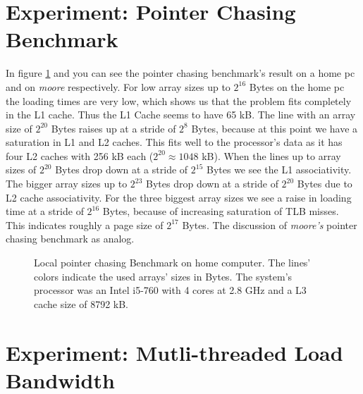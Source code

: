 \documentclass[DIV=12,oneside,a4paper]{scrartcl}
\begin{document}
\section{Experiment: Pointer Chasing Benchmark}
In figure \ref{pointer_chasing_local} and %
you can see the pointer chasing benchmark's result on a home pc and on \emph{moore}
respectively. For low array sizes up to $2^{16}$ Bytes on the home pc the loading times
are very low, which shows us that the problem fits completely in the L1 cache. Thus the
L1 Cache seems to have 65 kB. The line with an array size of $2^{20}$ Bytes raises
up at a stride of $2^8$ Bytes, because at this point we have a saturation in
L1 and L2 caches. This fits well to the processor's data as it has four
L2 caches with 256 kB each ($2^{20}\approx 1048$ kB). When the lines up to
array sizes of $2^20$ Bytes drop down at a stride of $2^15$ Bytes we see
the L1 associativity. The bigger array sizes up to $2^{23}$ Bytes drop
down at a stride of $2^{20}$ Bytes due to L2 cache associativity.
For the three biggest array sizes we see a raise in loading time at a stride of
$2^16$ Bytes, because of increasing saturation of TLB misses. This indicates roughly
a page size of $2^{17}$ Bytes. The discussion of \emph{moore's} pointer chasing benchmark
as analog.



\begin{figure}
	
	\label{pointer_chasing_local}
	\caption{Local pointer chasing Benchmark on home computer. The lines' colors indicate the
	         used arrays' sizes in Bytes. The system's processor was an Intel i5-760 with 
			 4 cores at 2.8 GHz and a L3 cache size of 8792 kB.}
\end{figure}




\section{Experiment: Mutli-threaded Load Bandwidth}
\end{document}
